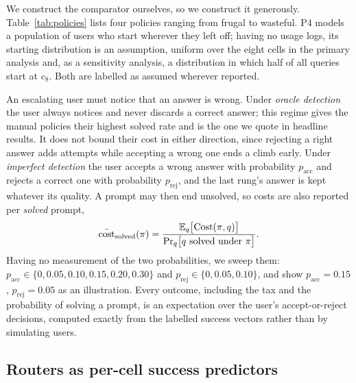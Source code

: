 We construct the comparator ourselves, so we construct it generously.
Table~\ref{tab:policies} lists four policies ranging from frugal to wasteful.
P4 models a population of users who start wherever they left off; having no
usage logs, its starting distribution is an assumption, uniform over the
eight cells in the primary analysis and, as a sensitivity analysis, a
distribution in which half of all queries start at $c_8$. Both are labelled
as assumed wherever reported.

An escalating user must notice that an answer is wrong. Under \emph{oracle
detection} the user always notices and never discards a correct answer; this
regime gives the manual policies their highest solved rate and is the one we
quote in headline results. It does not bound their cost in either direction,
since rejecting a right answer adds attempts while accepting a wrong one ends
a climb early. Under \emph{imperfect detection} the user accepts a wrong
answer with probability $p_{\mathrm{acc}}$ and rejects a correct one with
probability $p_{\mathrm{rej}}$, and the last rung's answer is kept whatever
its quality. A prompt may then end unsolved, so costs are also reported per
\emph{solved} prompt,
\begin{equation}
  \bar{\mathrm{cost}}_{\mathrm{solved}}(\pi) =
  \frac{\mathbb{E}_q\bigl[\mathrm{Cost}(\pi, q)\bigr]}
       {\Pr_q\bigl[\text{$q$ solved under $\pi$}\bigr]}.
  \label{eq:persolved}
\end{equation}
Having no measurement of the two probabilities, we sweep them:
$p_{\mathrm{acc}} \in \{0, 0.05, 0.10, 0.15, 0.20, 0.30\}$ and
$p_{\mathrm{rej}} \in \{0, 0.05, 0.10\}$, and show
$p_{\mathrm{acc}} = 0.15$, $p_{\mathrm{rej}} = 0.05$ as an illustration.
Every outcome, including the tax and the probability of solving a prompt, is
an expectation over the user's accept-or-reject decisions, computed exactly
from the labelled success vectors rather than by simulating users.

\subsection{Routers as per-cell success predictors}
\label{sec:routers}

